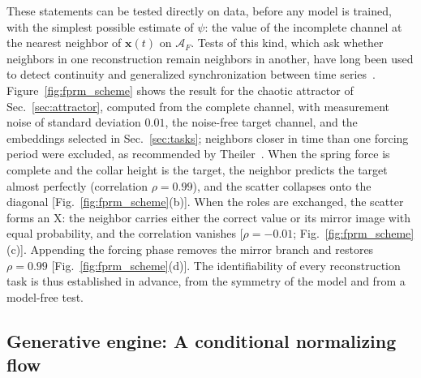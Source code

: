 These statements can be tested directly on data, before any model is trained, with the simplest possible estimate of $\psi$: the value of the incomplete channel at the nearest neighbor of $\mathbf x(t)$ on $\mathcal A_F$. Tests of this kind, which ask whether neighbors in one reconstruction remain neighbors in another, have long been used to detect continuity and generalized synchronization between time series~\cite{Pecora1995,Rulkov1995}. Figure~\ref{fig:fprm_scheme} shows the result for the chaotic attractor of Sec.~\ref{sec:attractor}, computed from the complete channel, with measurement noise of standard deviation $0.01$, the noise-free target channel, and the embeddings selected in Sec.~\ref{sec:tasks}; neighbors closer in time than one forcing period were excluded, as recommended by Theiler~\cite{Theiler1986}. When the spring force is complete and the collar height is the target, the neighbor predicts the target almost perfectly (correlation $\rho=0.99$), and the scatter collapses onto the diagonal [Fig.~\ref{fig:fprm_scheme}(b)]. When the roles are exchanged, the scatter forms an X: the neighbor carries either the correct value or its mirror image with equal probability, and the correlation vanishes [$\rho=-0.01$; Fig.~\ref{fig:fprm_scheme}(c)]. Appending the forcing phase removes the mirror branch and restores $\rho=0.99$ [Fig.~\ref{fig:fprm_scheme}(d)]. The identifiability of every reconstruction task is thus established in advance, from the symmetry of the model and from a model-free test.

\subsection{Generative engine: A conditional normalizing flow}\label{sec:flow}

